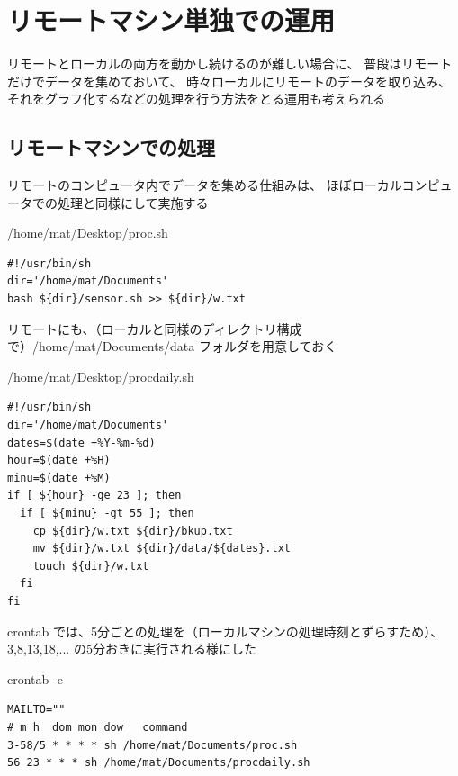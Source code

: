 \documentclass[12pt,a4paper,uplatex]{jsarticle}
\begin{document}
\newpage

\section{リモートマシン単独での運用}

リモートとローカルの両方を動かし続けるのが難しい場合に、
普段はリモートだけでデータを集めておいて、
時々ローカルにリモートのデータを取り込み、
それをグラフ化するなどの処理を行う方法をとる運用も考えられる

\subsection{リモートマシンでの処理}

リモートのコンピュータ内でデータを集める仕組みは、
ほぼローカルコンピュータでの処理と同様にして実施する

\begin{itembox}[l]{/home/mat/Desktop/proc.sh}
	\begin{verbatim}
#!/usr/bin/sh
dir='/home/mat/Documents'
bash ${dir}/sensor.sh >> ${dir}/w.txt
	\end{verbatim}
\end{itembox}

リモートにも、（ローカルと同様のディレクトリ構成で）/home/mat/Documents/data フォルダを用意しておく

\begin{itembox}[l]{/home/mat/Desktop/procdaily.sh}
	\begin{verbatim}
#!/usr/bin/sh
dir='/home/mat/Documents'
dates=$(date +%Y-%m-%d)
hour=$(date +%H)
minu=$(date +%M)
if [ ${hour} -ge 23 ]; then
  if [ ${minu} -gt 55 ]; then
    cp ${dir}/w.txt ${dir}/bkup.txt
    mv ${dir}/w.txt ${dir}/data/${dates}.txt
    touch ${dir}/w.txt
  fi
fi
	\end{verbatim}
\end{itembox}

\newpage

crontab では、5分ごとの処理を（ローカルマシンの処理時刻とずらすため）、3,8,13,18,... の5分おきに実行される様にした

\begin{itembox}[l]{crontab -e}
\begin{verbatim}
MAILTO=""
# m h  dom mon dow   command
3-58/5 * * * * sh /home/mat/Documents/proc.sh
56 23 * * * sh /home/mat/Documents/procdaily.sh
\end{verbatim}	
\end{itembox}
\end{document}
